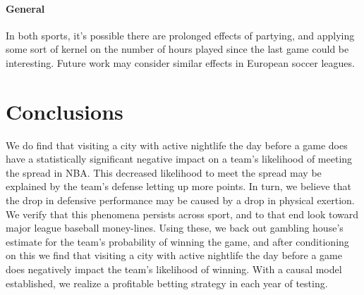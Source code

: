 \documentclass[letterpaper,12pt]{article}
\begin{document}
\paragraph{General}
In both sports, it's possible there are prolonged effects of partying, and applying some sort of kernel on the number of hours played since the last game could be interesting. 
Future work may consider similar effects in European soccer leagues.


\section{Conclusions}
We do find that visiting a city with active nightlife the day before a game does have 
a statistically significant negative impact on a team's likelihood of meeting the spread in NBA. This decreased likelihood to meet the spread may be explained 
by the team's defense letting up more points. In turn, we believe that the drop in
defensive performance may be caused by a drop in physical exertion.
We verify that this phenomena persists across sport, and 
to that end look toward major league baseball money-lines. Using these, we back out gambling
house's estimate for the team's probability of winning the game, and after conditioning on this
we find that visiting a city with active nightlife the day before a game does negatively 
impact the team's likelihood of winning.
With a causal model established, we realize a profitable betting strategy in each year of testing.



\end{document}
